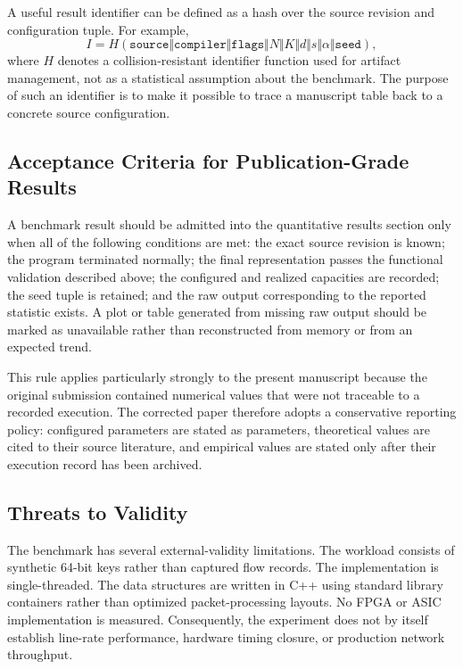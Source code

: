 \documentclass[conference]{IEEEtran}
\begin{document}
A useful result identifier can be defined as a hash over the source revision and
configuration tuple. For example,
\begin{equation}
    I=H(\texttt{source}\Vert\texttt{compiler}\Vert\texttt{flags}
       \Vert N\Vert K\Vert d\Vert s\Vert\alpha\Vert\texttt{seed}),
    \label{eq:run-id}
\end{equation}
where $H$ denotes a collision-resistant identifier function used for artifact
management, not as a statistical assumption about the benchmark. The purpose
of such an identifier is to make it possible to trace a manuscript table back
to a concrete source configuration.

\subsection{Acceptance Criteria for Publication-Grade Results}

A benchmark result should be admitted into the quantitative results section
only when all of the following conditions are met: the exact source revision is
known; the program terminated normally; the final representation passes the
functional validation described above; the configured and realized capacities
are recorded; the seed tuple is retained; and the raw output corresponding to
the reported statistic exists. A plot or table generated from missing raw
output should be marked as unavailable rather than reconstructed from memory or
from an expected trend.

This rule applies particularly strongly to the present manuscript because the
original submission contained numerical values that were not traceable to a
recorded execution. The corrected paper therefore adopts a conservative
reporting policy: configured parameters are stated as parameters, theoretical
values are cited to their source literature, and empirical values are stated
only after their execution record has been archived.

\subsection{Threats to Validity}

The benchmark has several external-validity limitations. The workload consists
of synthetic 64-bit keys rather than captured flow records. The implementation
is single-threaded. The data structures are written in C++ using standard
library containers rather than optimized packet-processing layouts. No FPGA or
ASIC implementation is measured. Consequently, the experiment does not by
itself establish line-rate performance, hardware timing closure, or production
network throughput.
\end{document}
